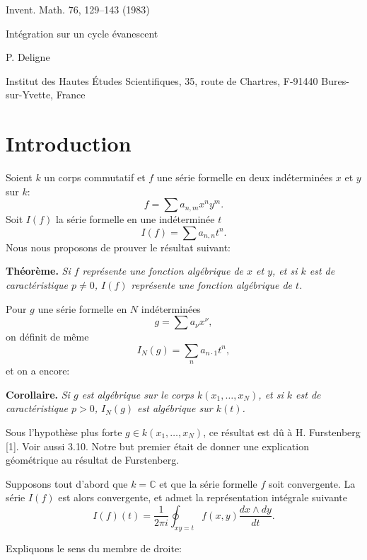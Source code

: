 \documentclass[11pt]{article}
\newcommand{\CC}{\mathbb C}
\begin{document}
\begin{center}
{\large Invent. Math. 76, 129--143 (1983)}\par
\vspace{2.5em}
{\LARGE Intégration sur un cycle évanescent}\par
\vspace{1.2em}
{\large P. Deligne}\par
\vspace{0.5em}
Institut des Hautes Études Scientifiques, 35, route de Chartres, F-91440 Bures-sur-Yvette, France
\end{center}

\section*{Introduction}

Soient $k$ un corps commutatif et $f$ une série formelle en deux indéterminées $x$ et $y$ sur $k$:
\[
        f=\sum a_{n,m}x^n y^m .
\]
Soit $I(f)$ la série formelle en une indéterminée $t$
\[
        I(f)=\sum a_{n,n}t^n .
\]
Nous nous proposons de prouver le résultat suivant:

\medskip
\noindent\textbf{Théorème.} \emph{Si $f$ représente une fonction algébrique de $x$ et $y$, et si $k$ est de caractéristique $p\ne0$, $I(f)$ représente une fonction algébrique de $t$.}

\medskip
Pour $g$ une série formelle en $N$ indéterminées
\[
        g=\sum a_\nu x^\nu,
\]
on définit de même
\[
        I_N(g)=\sum_n a_{n\cdot 1}t^n,
\]
et on a encore:

\medskip
\noindent\textbf{Corollaire.} \emph{Si $g$ est algébrique sur le corps $k(x_1,\ldots,x_N)$, et si $k$ est de caractéristique $p>0$, $I_N(g)$ est algébrique sur $k(t)$.}

\medskip
Sous l'hypothèse plus forte $g\in k(x_1,\ldots,x_N)$, ce résultat est dû à H. Furstenberg [1]. Voir aussi 3.10. Notre but premier était de donner une explication géométrique au résultat de Furstenberg.

Supposons tout d'abord que $k=\CC$ et que la série formelle $f$ soit convergente. La série $I(f)$ est alors convergente, et admet la représentation intégrale suivante
\begin{equation}
        I(f)(t)=\frac{1}{2\pi i}\oint_{xy=t} f(x,y)\frac{dx\wedge dy}{dt}. \tag{1}
\end{equation}

Expliquons le sens du membre de droite:
\end{document}
